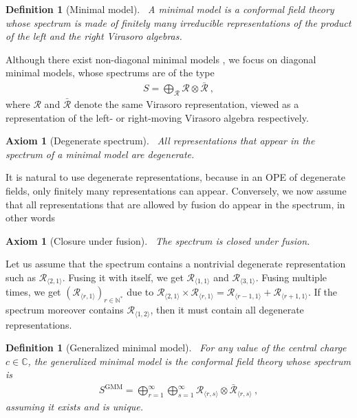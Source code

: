\documentclass[12pt, a4paper]{article}
\theoremstyle{break}
\newtheorem{hyp}[exo]{Axiom}
\newtheorem{defn}[exo]{Definition}
\begin{document}
\begin{defn}[Minimal model]
 ~\label{def:mm}
 A minimal model is a conformal field theory whose spectrum is made of finitely many irreducible representations of the product of the left and the right Virasoro algebras.
\end{defn}
Although there exist non-diagonal minimal models \cite{fms97}, we focus on diagonal minimal models, whose spectrums are of the type
\begin{align}
 S = \bigoplus_\mathcal{R} \mathcal{R}\otimes  \mathcal{\bar R}\ ,
\end{align}
where $\mathcal{R}$ and $ \mathcal{\bar R}$ denote the same Virasoro representation, viewed as a representation of the left- or right-moving Virasoro algebra respectively.

\begin{hyp}[Degenerate spectrum]
 ~\label{hyp:deg}
 All representations that appear in the spectrum of a minimal model are degenerate.
\end{hyp}
It is natural to use degenerate representations, because in an OPE of degenerate fields, only finitely many representations can appear. Conversely, we now assume that all representations that are allowed by fusion do appear in the spectrum, in other words

\begin{hyp}[Closure under fusion]
 ~\label{hyp:stab}
 The spectrum is closed under fusion. 
\end{hyp}

Let us assume that the spectrum contains a nontrivial degenerate representation such as $\mathcal{R}_{\langle 2,1\rangle}$. Fusing it with itself, we get $\mathcal{R}_{\langle 1, 1\rangle}$ and $\mathcal{R}_{\langle 3,1\rangle}$. Fusing multiple times, we get $(\mathcal{R}_{\langle r, 1\rangle})_{r\in\mathbb{N}^*}$ due to $\mathcal{R}_{\langle 2,1\rangle} \times \mathcal{R}_{\langle r,1\rangle} = \mathcal{R}_{\langle r-1,1\rangle}  + \mathcal{R}_{\langle r+1,1\rangle}$. If the spectrum moreover contains $\mathcal{R}_{\langle 1,2\rangle}$, then it must contain all degenerate representations. 

\begin{defn}[Generalized minimal model]
 ~\label{def:gmm}
 For any value of the central charge $c\in\mathbb{C}$, the generalized minimal model is the conformal field theory whose spectrum is
 \begin{align}
  S^\mathrm{GMM} = \bigoplus_{r=1}^\infty \bigoplus_{s=1}^\infty \mathcal{R}_{\langle r,s \rangle}\otimes  \mathcal{\bar R}_{\langle r,s \rangle} \ ,
 \end{align}
 assuming it exists and is unique.
\end{defn}
\end{document}
